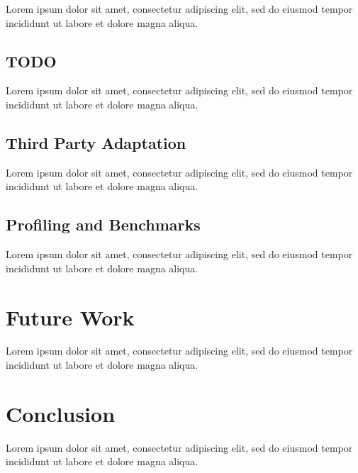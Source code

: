 \documentclass[12pt, a4paper]{article}
\begin{document}
Lorem ipsum dolor sit amet, consectetur adipiscing elit, sed do eiusmod tempor incididunt ut labore et dolore magna aliqua.


\subsection{TODO}

Lorem ipsum dolor sit amet, consectetur adipiscing elit, sed do eiusmod tempor incididunt ut labore et dolore magna aliqua.


\subsection{Third Party Adaptation}

Lorem ipsum dolor sit amet, consectetur adipiscing elit, sed do eiusmod tempor incididunt ut labore et dolore magna aliqua.


\subsection{Profiling and Benchmarks}

Lorem ipsum dolor sit amet, consectetur adipiscing elit, sed do eiusmod tempor incididunt ut labore et dolore magna aliqua.


\section{Future Work}

Lorem ipsum dolor sit amet, consectetur adipiscing elit, sed do eiusmod tempor incididunt ut labore et dolore magna aliqua.


\section{Conclusion}

Lorem ipsum dolor sit amet, consectetur adipiscing elit, sed do eiusmod tempor incididunt ut labore et dolore magna aliqua.
\end{document}
